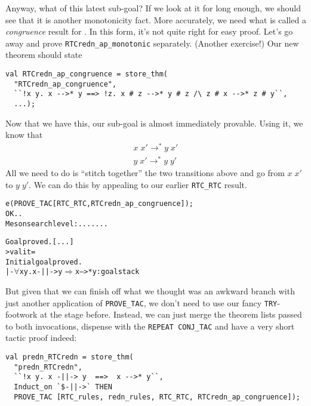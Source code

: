     Anyway, what of this latest sub-goal?  If we look at it for long
    enough, we should see that it is another monotonicity fact.  More
    accurately, we need what is called a \emph{congruence} result for
    \holtxt{-->*}.  In this form, it's not quite right for easy proof.
    Let's go away and prove \texttt{RTCredn\_ap\_monotonic}
    separately. (Another exercise!)  Our new theorem should state
\begin{session}
\begin{verbatim}
val RTCredn_ap_congruence = store_thm(
  "RTCredn_ap_congruence",
  ``!x y. x -->* y ==> !z. x # z -->* y # z /\ z # x -->* z # y``,
  ...);
\end{verbatim}
\end{session}
    Now that we have this, our sub-goal is almost immediately
    provable.  Using it, we know that \[\begin{array}{c}
      x\;x' \rightarrow^* y\;x' \\
      y\;x' \rightarrow^* y\;y'
    \end{array}\]
    All we need to do is ``stitch together'' the two transitions above
    and go from $x\;x'$ to $y\;y'$.  We can do this by appealing to our
    earlier \texttt{RTC\_RTC} result.
\begin{session}
\begin{alltt}
e (PROVE_TAC [RTC_RTC, RTCredn_ap_congruence]);
OK..
Meson search level: .......

Goal proved. [...]
> val it =
    Initial goal proved.
    |- \(\forall\)x y. x -||-> y \(\Rightarrow\) x -->* y : goalstack
\end{alltt}
\end{session}
But given that we can finish off what we thought was an awkward branch
with just another application of \texttt{PROVE\_TAC}, we don't need to
use our fancy \texttt{TRY}-footwork at the stage before.  Instead, we
can just merge the theorem lists passed to both invocations, dispense
with the \texttt{REPEAT CONJ\_TAC} and have a very short tactic proof
indeed:
\begin{session}
\begin{verbatim}
val predn_RTCredn = store_thm(
  "predn_RTCredn",
  ``!x y. x -||-> y  ==>  x -->* y``,
  Induct_on `$-||->` THEN
  PROVE_TAC [RTC_rules, redn_rules, RTC_RTC, RTCredn_ap_congruence]);
\end{verbatim}
\end{session}
\eos{}

